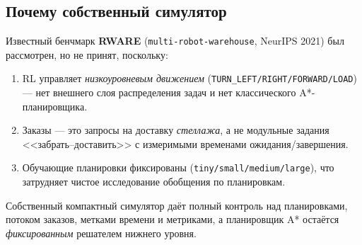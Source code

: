 \documentclass[11pt,a4paper]{article}
\newcommand{\code}[1]{\texttt{#1}}
\begin{document}
\subsection{Почему собственный симулятор}
Известный бенчмарк \textbf{RWARE} (\code{multi-robot-warehouse}, NeurIPS 2021)
был рассмотрен, но не принят, поскольку:
\begin{enumerate}[nosep]
\item RL управляет \emph{низкоуровневым движением}
(\code{TURN\_LEFT/RIGHT/FORWARD/LOAD}) — нет внешнего слоя распределения задач и
нет классического A*-планировщика.
\item Заказы — это запросы на доставку \emph{стеллажа}, а не модульные задания
<<забрать--доставить>> с измеримыми временами ожидания/завершения.
\item Обучающие планировки фиксированы (\code{tiny/small/medium/large}), что
затрудняет чистое исследование обобщения по планировкам.
\end{enumerate}

Собственный компактный симулятор даёт полный контроль над планировками, потоком
заказов, метками времени и метриками, а планировщик A* остаётся
\emph{фиксированным} решателем нижнего уровня.

\end{document}
